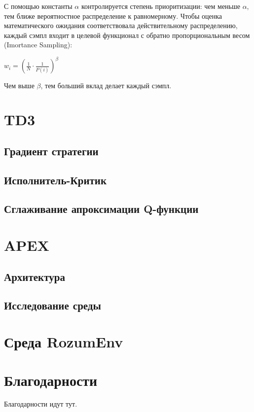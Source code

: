 \documentclass{mipt-thesis-bs}
\begin{document}
С помощью константы $\alpha$ контролируется степень приоритизации: чем меньше $\alpha$, тем ближе вероятностное распределение к равномерному. Чтобы оценка математического ожидания соответствовала действительному распределению, каждый сэмпл входит в целевой функционал с обратно пропорциональным весом (Imortance Sampling):

\begin{center}
$w_{i}=\left(\frac{1}{N} \cdot \frac{1}{P(i)}\right)^{\beta}$    
\end{center}

Чем выше $\beta$, тем больший вклад делает каждый сэмпл.

 \chapter{TD3}
\section{Градиент стратегии}
\section{Исполнитель-Критик}
\section{Сглаживание апроксимации Q-функции}


\chapter{APEX}
\section{Архитектура}
\section{Исследование среды}

\chapter{Среда RozumEnv}


\backmatter


\chapter{Благодарности}

Благодарности идут тут.
\end{document}
